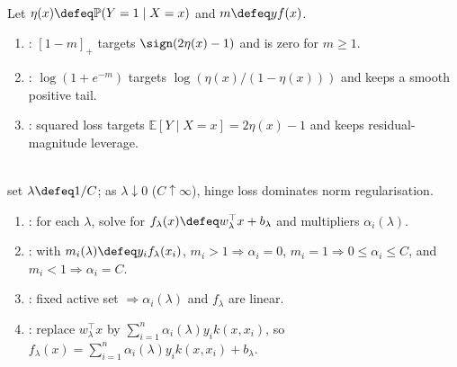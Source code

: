 \begin{remark} \label{rem:sl-hinge-logistic-squared-loss-contrast} \\
Let $\eta(x)\defeq\mathbb{P}(Y=1\mid X=x)$ and $m\defeq yf(x)$.
\begin{enumerate}[label=(\roman*)]
\setlength{\itemsep}{0pt}
\item {}: $[1-m]_+$ targets $\sign(2\eta(x)-1)$ and is zero for $m\geq1$.
\item {}: $\log(1+e^{-m})$ targets $\log(\eta(x)/(1-\eta(x)))$ and keeps a smooth positive tail.
\item {}: squared loss targets $\mathbb{E}[Y\mid X=x]=2\eta(x)-1$ and keeps residual-magnitude leverage.
\end{enumerate}
\end{remark}

\begin{method} \label{meth:sl-svm-regularization-path-view} \\
set $\lambda\defeq1/C$; as $\lambda\downarrow0$ ($C\uparrow\infty$), hinge loss dominates norm regularisation.
\begin{enumerate}[label=(\roman*)]
\setlength{\itemsep}{0pt}
\item {}: for each $\lambda$, solve for $f_\lambda(x)\defeq w_\lambda^\top x+b_\lambda$ and multipliers $\alpha_i(\lambda)$.
\item {}: with $m_i(\lambda)\defeq y_if_\lambda(x_i)$, $m_i>1\Rightarrow\alpha_i=0$, $m_i=1\Rightarrow0\leq\alpha_i\leq C$, and $m_i<1\Rightarrow\alpha_i=C$.
\item {}: fixed active set $\Rightarrow\alpha_i(\lambda)$ and $f_\lambda$ are linear.
\item {}: replace $w_\lambda^\top x$ by $\sum\limits_{i=1}^n\alpha_i(\lambda)y_ik(x,x_i)$, so $f_\lambda(x)=\sum\limits_{i=1}^n\alpha_i(\lambda)y_ik(x,x_i)+b_\lambda$.
\end{enumerate}
\end{method}

